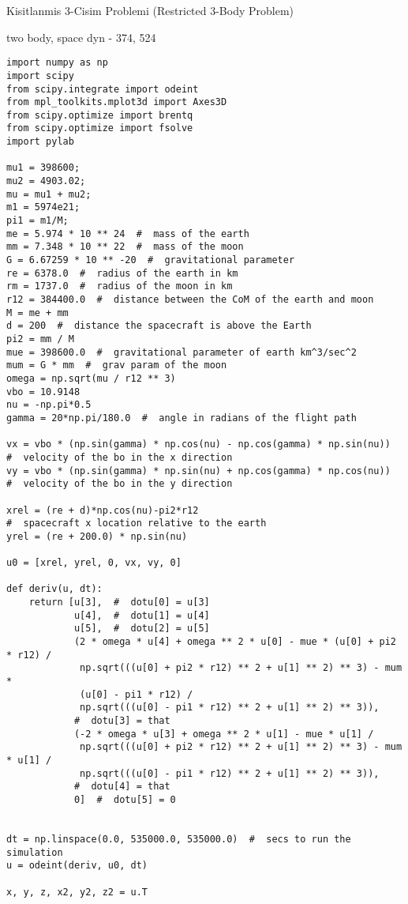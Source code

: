 \documentclass[12pt,fleqn]{article}\usepackage{../../common}
\begin{document}
Kisitlanmis 3-Cisim Problemi (Restricted 3-Body Problem)

two body, space dyn - 374, 524

\begin{verbatim}
import numpy as np
import scipy
from scipy.integrate import odeint
from mpl_toolkits.mplot3d import Axes3D
from scipy.optimize import brentq
from scipy.optimize import fsolve
import pylab

mu1 = 398600;
mu2 = 4903.02;
mu = mu1 + mu2;
m1 = 5974e21;
pi1 = m1/M;
me = 5.974 * 10 ** 24  #  mass of the earth
mm = 7.348 * 10 ** 22  #  mass of the moon
G = 6.67259 * 10 ** -20  #  gravitational parameter
re = 6378.0  #  radius of the earth in km
rm = 1737.0  #  radius of the moon in km
r12 = 384400.0  #  distance between the CoM of the earth and moon
M = me + mm
d = 200  #  distance the spacecraft is above the Earth
pi2 = mm / M
mue = 398600.0  #  gravitational parameter of earth km^3/sec^2
mum = G * mm  #  grav param of the moon
omega = np.sqrt(mu / r12 ** 3)
vbo = 10.9148
nu = -np.pi*0.5
gamma = 20*np.pi/180.0  #  angle in radians of the flight path

vx = vbo * (np.sin(gamma) * np.cos(nu) - np.cos(gamma) * np.sin(nu))
#  velocity of the bo in the x direction
vy = vbo * (np.sin(gamma) * np.sin(nu) + np.cos(gamma) * np.cos(nu))
#  velocity of the bo in the y direction

xrel = (re + d)*np.cos(nu)-pi2*r12
#  spacecraft x location relative to the earth
yrel = (re + 200.0) * np.sin(nu)

u0 = [xrel, yrel, 0, vx, vy, 0]

def deriv(u, dt):
    return [u[3],  #  dotu[0] = u[3]
            u[4],  #  dotu[1] = u[4]
            u[5],  #  dotu[2] = u[5]
            (2 * omega * u[4] + omega ** 2 * u[0] - mue * (u[0] + pi2 * r12) /
             np.sqrt(((u[0] + pi2 * r12) ** 2 + u[1] ** 2) ** 3) - mum *
             (u[0] - pi1 * r12) /
             np.sqrt(((u[0] - pi1 * r12) ** 2 + u[1] ** 2) ** 3)),
            #  dotu[3] = that
            (-2 * omega * u[3] + omega ** 2 * u[1] - mue * u[1] /
             np.sqrt(((u[0] + pi2 * r12) ** 2 + u[1] ** 2) ** 3) - mum * u[1] /
             np.sqrt(((u[0] - pi1 * r12) ** 2 + u[1] ** 2) ** 3)),
            #  dotu[4] = that
            0]  #  dotu[5] = 0


dt = np.linspace(0.0, 535000.0, 535000.0)  #  secs to run the simulation
u = odeint(deriv, u0, dt)

x, y, z, x2, y2, z2 = u.T


\end{verbatim}
\end{document}
